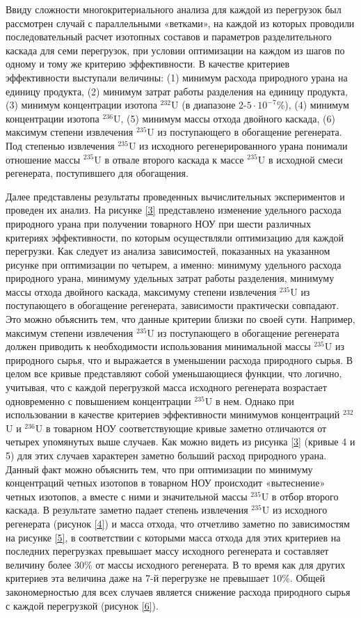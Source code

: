 Ввиду сложности многокритериального анализа для каждой из перегрузок был рассмотрен случай с параллельными «ветками», на каждой из которых проводили последовательный расчет изотопных составов и параметров разделительного каскада для семи перегрузок, при условии оптимизации на каждом из шагов по одному и тому же критерию эффективности. В качестве критериев эффективности выступали величины: (1) минимум расхода природного урана на единицу продукта, (2) минимум затрат работы разделения на единицу продукта, (3) минимум концентрации изотопа $^{232}$U (в диапазоне 2-$5\cdot10^{-7}$\%), (4) минимум концентрации изотопа $^{236}$U, (5) минимум массы отхода двойного каскада, (6) максимум степени извлечения $^{235}$U из поступающего в обогащение регенерата. Под степенью извлечения $^{235}$U из исходного регенерированного урана понимали отношение массы $^{235}$U в отвале второго каскада к массе $^{235}$U в исходной смеси регенерата, поступившего для обогащения.

Далее представлены результаты проведенных вычислительных экспериментов и проведен их анализ. 
На рисунке \ref{3} представлено изменение удельного расхода природного урана при получении товарного НОУ при шести различных критериях эффективности, по которым осуществляли оптимизацию для каждой перегрузки. Как следует из анализа зависимостей, показанных на указанном рисунке при оптимизации по четырем, а именно: минимуму удельного расхода природного урана, минимуму удельных затрат работы разделения, минимуму массы отхода двойного каскада, максимуму степени извлечения $^{235}$U из поступающего в обогащение регенерата, зависимости практически совпадают. Это можно объяснить тем, что данные критерии близки по своей сути. Например, максимум степени извлечения $^{235}$U из поступающего в обогащение регенерата должен приводить к необходимости использования минимальной массы $^{235}$U из природного сырья, что и выражается в уменьшении расхода природного сырья. В целом все кривые представляют собой уменьшающиеся функции, что логично, учитывая, что с каждой перегрузкой масса исходного регенерата возрастает одновременно с повышением концентрации $^{235}$U в нем. Однако при использовании в качестве критериев эффективности минимумов концентраций $^{232}$U и $^{236}$U в товарном НОУ соответствующие кривые заметно отличаются от четырех упомянутых выше случаев. Как можно видеть из рисунка \ref{3} (кривые 4 и 5) для этих случаев характерен заметно больший расход природного урана. Данный факт можно объяснить тем, что при оптимизации по минимуму концентраций четных изотопов в товарном НОУ происходит «вытеснение» четных изотопов, а вместе с ними и значительной массы $^{235}$U в отбор второго каскада. В результате заметно падает степень извлечения $^{235}$U из исходного регенерата (рисунок \ref{4}) и масса отхода, что отчетливо заметно по зависимостям на рисунке \ref{5}, в соответствии с которыми масса отхода для этих критериев на последних перегрузках превышает массу исходного регенерата и составляет величину более 30\% от массы исходного регенерата. В то время как для других критериев эта величина даже на 7-й перегрузке не превышает 10\%. Общей закономерностью для всех случаев является снижение расхода природного сырья с каждой перегрузкой (рисунок \ref{6}).


